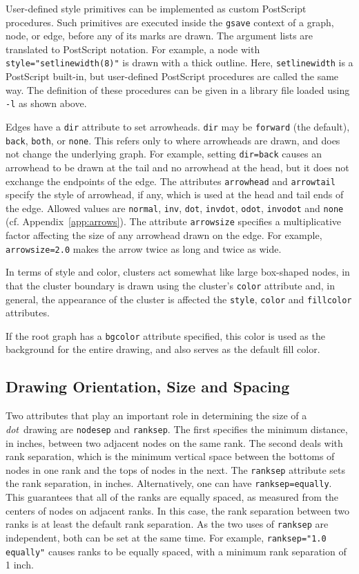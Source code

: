 \documentclass[11pt]{article}
\def\dot{{\it dot}}
\begin{document}
User-defined style primitives can be implemented as custom
PostScript procedures.  Such primitives are executed inside the
\verb"gsave" context of a graph, node, or edge, before any of its
marks are drawn.  The argument lists are translated to PostScript notation.
For example, a node with \verb'style="setlinewidth(8)"'  is drawn with a
thick outline.  Here, \verb"setlinewidth" is a PostScript built-in, but
user-defined PostScript procedures are called the same way.  The
definition of these procedures can be given in a library file loaded
using \verb"-l" as shown above.

Edges have a \verb"dir" attribute to set arrowheads.
\verb"dir" may be \verb"forward" (the default), \verb"back", \verb"both",
or \verb"none".  This refers only to where arrowheads are drawn, and does
not change the underlying graph.  For example, setting \verb"dir=back"
causes an arrowhead to be drawn at the tail and no arrowhead at the head,
but it does not exchange the endpoints of the edge. The attributes
{\tt arrowhead} and {\tt arrowtail} specify the style of arrowhead,
if any, which is used at the head and tail ends of the edge.
Allowed values are {\tt normal}, {\tt inv}, {\tt dot}, {\tt invdot}, 
{\tt odot}, {\tt invodot} and {\tt none} (cf. Appendix~\ref{app:arrows}).
The attribute {\tt arrowsize} specifies a multiplicative factor affecting
the size of any arrowhead drawn on the edge.
For example, {\tt arrowsize=2.0} makes the arrow twice as long and twice
as wide.

In terms of style and color, clusters act somewhat like large box-shaped
nodes, in that the cluster boundary is drawn using the cluster's
{\tt color} attribute and, in general, the appearance of the 
cluster is affected the {\tt style}, {\tt color} and {\tt fillcolor}
attributes.

If the root graph has a {\tt bgcolor} attribute specified, this color is used
as the background for the entire drawing, and also serves as the default
fill color.

\subsection{Drawing Orientation, Size and Spacing}

Two attributes that play an important role in determining the size of
a \dot\ drawing are {\tt nodesep} and {\tt ranksep}.
The first specifies the minimum distance, in inches, between two 
adjacent nodes on the same rank.
The second deals with rank separation, which is the minimum vertical space
between the bottoms of nodes in one rank and the tops of nodes in the next.
The {\tt ranksep} attribute sets the rank separation, in inches.
Alternatively, one can have {\tt ranksep=equally}. This guarantees
that all of the ranks are equally spaced, as measured from the
centers of nodes on adjacent ranks. In this case, the rank separation
between two ranks is at least the default rank separation. As the
two uses of {\tt ranksep} are independent, both can be set at the
same time. For example, {\tt ranksep="1.0 equally"} causes ranks to
be equally spaced, with a minimum rank separation of 1 inch.
\end{document}
